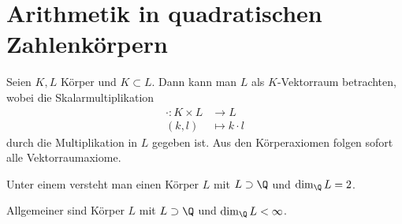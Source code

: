 \chapter{Arithmetik in quadratischen Zahlenkörpern}

\begin{df} \label{4.1}
	Seien $K, L$ Körper und $K \subset L$.
	Dann kann man $L$ als $K$-Vektorraum betrachten, wobei die Skalarmultiplikation
	\begin{align*}
		\cdot : K \times L &\to L \\
		(k,l) &\mapsto k \cdot l
	\end{align*}
	durch die Multiplikation in $L$ gegeben ist.
	Aus den Körperaxiomen folgen sofort alle Vektorraumaxiome.
\end{df}

\begin{df} \label{4.2}
	Unter einem  versteht man einen Körper $L$ mit $L \supset \Q$ und $\dim_{\Q} L = 2$.

	Allgemeiner sind  Körper $L$ mit $L \supset \Q$ und $\dim_\Q L < \infty$.
\end{df}

